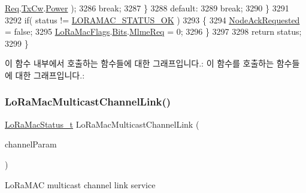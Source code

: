 \begin{DoxyCode}
      \mbox{\hyperlink{structs_mlme_req_ae8fae82634858192f75515c1b7daaadc}{Req}}.\mbox{\hyperlink{unions_mlme_req_1_1u_mlme_param_aa69808af2b2999fc4b8b409b593173ab}{TxCw}}.\mbox{\hyperlink{structs_mlme_req_tx_cw_ab44615b5dd16068c5a1bfb228b72c081}{Power}} );
3286             \textcolor{keywordflow}{break};
3287         \}
3288         \textcolor{keywordflow}{default}:
3289             \textcolor{keywordflow}{break};
3290     \}
3291 
3292     \textcolor{keywordflow}{if}( status != \mbox{\hyperlink{group___l_o_r_a_m_a_c_gga1d18f26b344040b3ec5c3db662919661a03db5fca052313edb3823c014b653a74}{LORAMAC\_STATUS\_OK}} )
3293     \{
3294         \mbox{\hyperlink{_lo_ra_mac_8c_aa8b1d676119798345f588d3ab525e83f}{NodeAckRequested}} = \textcolor{keyword}{false};
3295         \mbox{\hyperlink{_lo_ra_mac_8c_ae3a39c60e22c9458dd8536a1b2b773e3}{LoRaMacFlags}}.\mbox{\hyperlink{unione_lo_ra_mac_flags__t_aaed1c36f988521e76eaa81554e1e8e96}{Bits}}.\mbox{\hyperlink{structe_lo_ra_mac_flags__t_1_1s_mac_flag_bits_a3743e193dca88e3913e44e993a209ebf}{MlmeReq}} = 0;
3296     \}
3297 
3298     \textcolor{keywordflow}{return} status;
3299 \}
\end{DoxyCode}
이 함수 내부에서 호출하는 함수들에 대한 그래프입니다.\+:
이 함수를 호출하는 함수들에 대한 그래프입니다.\+:
\mbox{\label{group___l_o_r_a_m_a_c_ga89622bf6a1705558ba7b76dbb2d59c2f}} 
\subsubsection{\texorpdfstring{Lo\+Ra\+Mac\+Multicast\+Channel\+Link()}{LoRaMacMulticastChannelLink()}}
{\footnotesize\ttfamily \mbox{\hyperlink{group___l_o_r_a_m_a_c_ga30bd25657e10480f8605ee951b0ecfbd}{Lo\+Ra\+Mac\+Status\+\_\+t}} Lo\+Ra\+Mac\+Multicast\+Channel\+Link (\begin{DoxyParamCaption}\item[{\mbox{\hyperlink{group___l_o_r_a_m_a_c_ga02d2523505cac70954c043074087ea65}{Multicast\+Params\+\_\+t}} $\ast$}]{channel\+Param }\end{DoxyParamCaption})}



Lo\+Ra\+M\+AC multicast channel link service 

